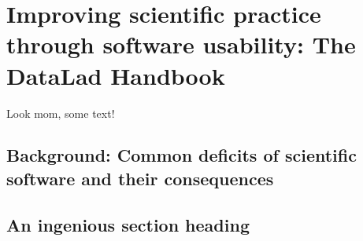 

\chapter{Improving scientific practice through software usability: The DataLad Handbook}
\label{chap:k2}

Look mom, some text!

\section{Background: Common deficits of scientific software and their consequences}
\pagebreak

\section{An ingenious section heading}
\pagebreak


